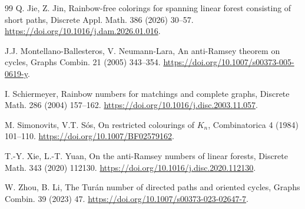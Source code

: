 \documentclass[10pt,a4paper]{article}
\begin{document}
\begin{thebibliography}{99}
Q. Jie, Z. Jin,
Rainbow-free colorings for spanning linear forest consisting of short paths,
Discrete Appl. Math. 386 (2026) 30--57.
\url{https://doi.org/10.1016/j.dam.2026.01.016}.

J.J. Montellano-Ballesteros, V. Neumann-Lara,
An anti-Ramsey theorem on cycles,
Graphs Combin. 21 (2005) 343--354.
\url{https://doi.org/10.1007/s00373-005-0619-y}.

I. Schiermeyer,
Rainbow numbers for matchings and complete graphs,
Discrete Math. 286 (2004) 157--162.
\url{https://doi.org/10.1016/j.disc.2003.11.057}.

M. Simonovits, V.T. S\'os,
On restricted colourings of $K_n$,
Combinatorica 4 (1984) 101--110.
\url{https://doi.org/10.1007/BF02579162}.

T.-Y. Xie, L.-T. Yuan,
On the anti-Ramsey numbers of linear forests,
Discrete Math. 343 (2020) 112130.
\url{https://doi.org/10.1016/j.disc.2020.112130}.

W. Zhou, B. Li,
The Tur\'an number of directed paths and oriented cycles,
Graphs Combin. 39 (2023) 47.
\url{https://doi.org/10.1007/s00373-023-02647-7}.

\end{thebibliography}
\end{document}
